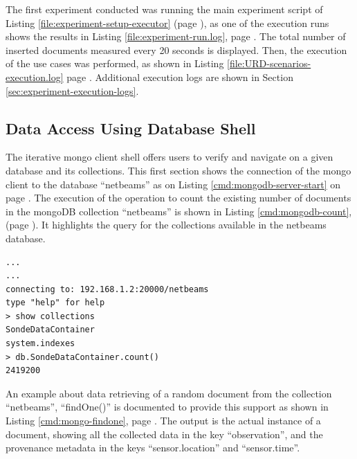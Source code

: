 The first experiment conducted was running the main experiment script of Listing
\ref{file:experiment-setup-executor} (page
\pageref{file:experiment-setup-executor}), as one of the execution runs shows
the results in Listing \ref{file:experiment-run.log}, page
\pageref{file:experiment-run.log}. The total number of inserted documents
measured every 20 seconds is displayed. Then, the execution of the use cases
was performed, as shown in Listing \ref{file:URD-scenarios-execution.log} page
\pageref{file:URD-scenarios-execution.log}. Additional execution logs are
shown in Section \ref{sec:experiment-execution-logs}.

\subsection{Data Access Using Database Shell}
\label{sec:mongodb-user-experience}

The iterative mongo client shell offers users to verify and navigate on a
given database and its collections. This first section shows the connection of
the mongo client to the database ``netbeams'' as on Listing
\ref{cmd:mongodb-server-start} on page \pageref{cmd:mongodb-server-start}. The
execution of the operation to count the existing number of documents in the
mongoDB collection ``netbeams'' is shown in Listing \ref{cmd:mongodb-count},
(page \pageref{cmd:mongodb-count}). It highlights the query for the collections
available in the netbeams database.

\lstset{label=cmd:mongodb-count,caption=Starting the Server}
\begin{lstlisting}
...
...
connecting to: 192.168.1.2:20000/netbeams
type "help" for help
> show collections
SondeDataContainer
system.indexes
> db.SondeDataContainer.count()
2419200
\end{lstlisting}

An example about data retrieving of a random document from the collection
``netbeams'', ``findOne()'' is documented to provide this support as shown in
Listing \ref{cmd:mongo-findone}, page \pageref{cmd:mongo-findone}. The output
is the actual instance of a document, showing all the collected data in the
key ``observation'', and the provenance metadata in the keys
``sensor.location'' and ``sensor.time''.

